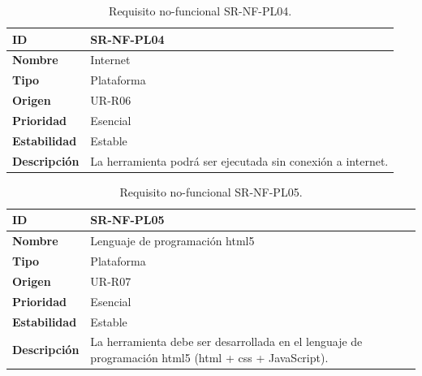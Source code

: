 \begin{center}
\begin{table}[htbp]
\centering
\caption{Requisito no-funcional SR-NF-PL04.}
\begin{tabular}{@{}p{2.5cm} p{9cm}@{}} 
\toprule
\textbf{ID} 				& SR-NF-PL04 \\
\midrule
\textbf{Nombre} 			& Internet \\
\midrule
\textbf{Tipo} 			& Plataforma \\
\midrule
\textbf{Origen} 			& UR-R06 \\
\midrule
\textbf{Prioridad}		& Esencial \\
\midrule
\textbf{Estabilidad} 		& Estable \\
\midrule
\textbf{Descripción} 	& La herramienta podrá ser ejecutada sin conexión a internet. \\
\bottomrule
\end{tabular}
\label{tab:srnfpl04}
\end{table}
\end{center}

\begin{center}
\begin{table}[htbp]
\centering
\caption{Requisito no-funcional SR-NF-PL05.}
\begin{tabular}{@{}p{2.5cm} p{9cm}@{}} 
\toprule
\textbf{ID} 				& SR-NF-PL05 \\
\midrule
\textbf{Nombre} 			& Lenguaje de programación \acrshort{html}5 \\
\midrule
\textbf{Tipo} 			& Plataforma \\
\midrule
\textbf{Origen} 			& UR-R07 \\
\midrule
\textbf{Prioridad}		& Esencial \\
\midrule
\textbf{Estabilidad} 		& Estable \\
\midrule
\textbf{Descripción} 	& La herramienta debe ser desarrollada en el lenguaje de programación \acrshort{html}5 (\acrshort{html} + \acrshort{css} + JavaScript). \\
\bottomrule
\end{tabular}
\label{tab:srnfpl05}
\end{table}
\end{center}

